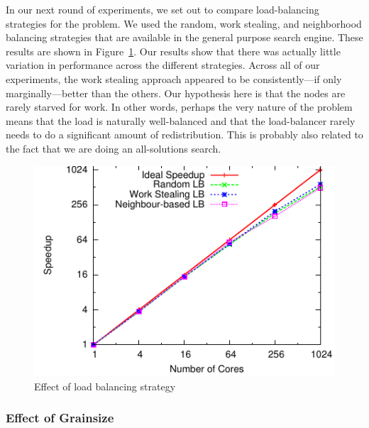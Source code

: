 \documentclass[10pt, conference, compsocconf]{IEEEtran}
\begin{document}
In our next round of experiments, we set out to compare load-balancing
strategies for the problem.  We used the random, work stealing, and
neighborhood balancing strategies that are available in the general purpose
search engine.  These results are shown in Figure~\ref{3schemes}.  Our results
show that there was actually little variation in performance across the
different strategies.  Across all of our experiments, the work stealing
approach appeared to be consistently---if only marginally---better than the
others.  Our hypothesis here is that the nodes are rarely starved for work.  In
other words, perhaps the very nature of the problem means that the load is
naturally well-balanced and that the load-balancer rarely needs to do a
significant amount of redistribution.  This is probably also related to the
fact that we are doing an all-solutions search. 
\begin{figure}[ht]
\centering
\includegraphics[width=0.9\columnwidth]{plots/3schemes.pdf}

\caption{Effect of load balancing strategy}
\label{3schemes}
\end{figure}
 
\subsubsection{Effect of Grainsize}
\end{document}
